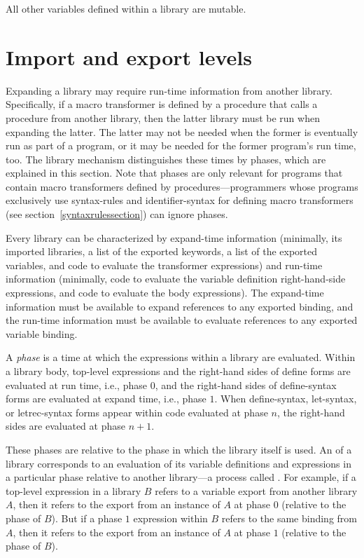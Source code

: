 All other variables defined within a library are mutable.

\section{Import and export levels}
\label{phasessection}

Expanding a library may require run-time information from another
library. Specifically, if a macro transformer is defined by a
procedure that calls a procedure from another library, then the latter
library must be run when expanding the latter.  The latter may not be
needed when the former is eventually run as part of a program, or it
may be needed for the former program's run time, too.  The library
mechanism distinguishes these times by phases, which are explained in
this section.  Note that phases are only relevant for programs that
contain macro transformers defined by procedures---programmers whose programs
exclusively use {\cf syntax-rules} and {\cf identifier-syntax} for
defining macro transformers (see section~\ref{syntaxrulessection}) can
ignore phases.

Every library can be characterized by expand-time information (minimally,
its imported libraries, a list of the exported keywords, a list of the
exported variables, and code to evaluate the transformer expressions) and
run-time information (minimally, code to evaluate the variable definition
right-hand-side expressions, and code to evaluate the body expressions).
The expand-time information must be available to expand references to
any exported binding, and the run-time information must be available to
evaluate references to any exported variable binding.

%
A \emph{phase} is a time at which the expressions within a library are
evaluated.
Within a library body, top-level expressions and
the right-hand sides of {\cf define} forms are evaluated at run time,
i.e., phase $0$, and the right-hand
sides of {\cf define-syntax} forms are evaluated at expand time, i.e.,
phase $1$.
When {\cf define-syntax},
{\cf let-syntax}, or {\cf letrec-syntax}
forms appear within code evaluated at phase $n$, the right-hand sides
are evaluated at phase $n+1$.

These phases are relative to the phase in which the library itself is
used.
An  of a library corresponds to an evaluation of its
variable definitions and expressions in a particular phase relative to another
library---a process called .
For example, if a top-level expression in a library $B$ refers to
a variable export from another library $A$, then it refers to the export from an
instance of $A$ at phase $0$ (relative to the phase of $B$).
But if a phase $1$ expression within $B$ refers to the same binding from
$A$, then it refers to the export from an instance of $A$ at phase $1$
(relative to the phase of $B$).

